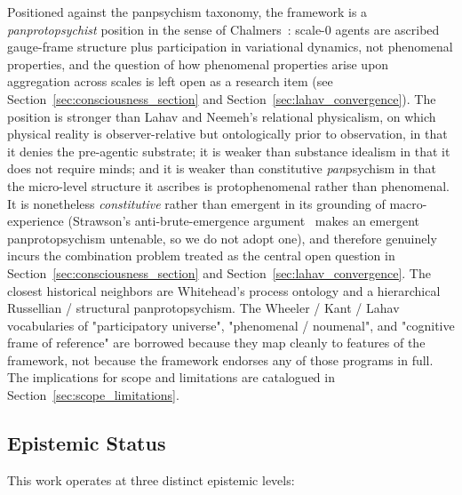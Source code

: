 \documentclass[11pt]{article}
\begin{document}
Positioned against the panpsychism taxonomy, the framework is a \emph{panprotopsychist} position in the sense of Chalmers~\cite{Chalmers2013consciousness, Chalmers2016}: scale-0 agents are ascribed gauge-frame structure plus participation in variational dynamics, not phenomenal properties, and the question of how phenomenal properties arise upon aggregation across scales is left open as a research item (see Section~\ref{sec:consciousness_section} and Section~\ref{sec:lahav_convergence}). The position is stronger than Lahav and Neemeh's relational physicalism, on which physical reality is observer-relative but ontologically prior to observation, in that it denies the pre-agentic substrate; it is weaker than substance idealism in that it does not require minds; and it is weaker than constitutive \emph{pan}psychism in that the micro-level structure it ascribes is protophenomenal rather than phenomenal. It is nonetheless \emph{constitutive} rather than emergent in its grounding of macro-experience (Strawson's anti-brute-emergence argument~\cite{Strawson2006} makes an emergent panprotopsychism untenable, so we do not adopt one), and therefore genuinely incurs the combination problem treated as the central open question in Section~\ref{sec:consciousness_section} and Section~\ref{sec:lahav_convergence}. The closest historical neighbors are Whitehead's process ontology and a hierarchical Russellian / structural panprotopsychism. The Wheeler / Kant / Lahav vocabularies of "participatory universe", "phenomenal / noumenal", and "cognitive frame of reference" are borrowed because they map cleanly to features of the framework, not because the framework endorses any of those programs in full. The implications for scope and limitations are catalogued in Section~\ref{sec:scope_limitations}.

\subsection{Epistemic Status}
\label{sec:epistemic_status}

This work operates at three distinct epistemic levels:
\end{document}
